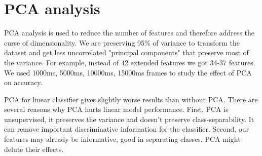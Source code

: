 \documentclass[conference]{IEEEtran}
\begin{document}
\section{PCA analysis}

PCA analysis is used to reduce the number of features and therefore address the curse of dimensionality. 
We are preserving 95\% of variance to transform the dataset and get less uncorrelated "principal components" that preserve most of the variance.
For example, instead of 42 extended features we got 34-37 features.
We used 1000ms, 5000ms, 10000ms, 15000ms frames to study the effect of PCA on accuracy.


\begin{table}[h]
\centering
\caption{Linear model performance with PCA-reduced features.}
\label{tab:linear_model_pca}
\end{table}


PCA for linear classifier gives slightly worse results than without PCA.
There are several reasons why PCA hurts linear model performance. 
First, PCA is unsupervised, it preserves the variance and doesn't preserve class-separability.
It can remove important discriminative information for the classifier.
Second, our features may already be informative, good in separating classes.
PCA might delute their effects.

\end{document}
